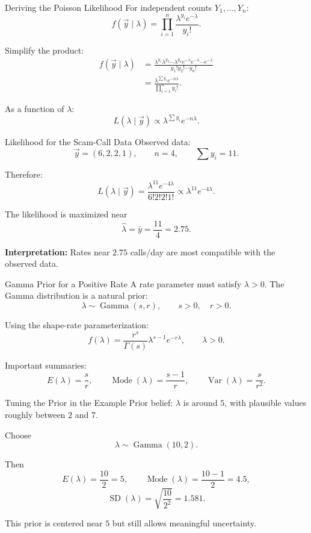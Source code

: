 \documentclass[aspectratio=43,11pt]{beamer}
\newcommand{\GammaDist}{\operatorname{Gamma}}
\begin{document}
\begin{frame}{Deriving the Poisson Likelihood}
For independent counts $Y_1,\ldots,Y_n$:
\[
  f(\vec y\mid \lambda)=\prod_{i=1}^n \frac{\lambda^{y_i}e^{-\lambda}}{y_i!}.
\]

\medskip
Simplify the product:
\[
\begin{aligned}
  f(\vec y\mid \lambda)
  &=\frac{\lambda^{y_1}\lambda^{y_2}\cdots\lambda^{y_n}
      e^{-\lambda}e^{-\lambda}\cdots e^{-\lambda}}
      {y_1!y_2!\cdots y_n!} \\
  &=\frac{\lambda^{\sum y_i}e^{-n\lambda}}{\prod_{i=1}^n y_i!}.
\end{aligned}
\]

As a function of $\lambda$:
\[
  L(\lambda\mid \vec y) \propto \lambda^{\sum y_i}e^{-n\lambda}.
\]
\end{frame}

\begin{frame}{Likelihood for the Scam-Call Data}
Observed data:
\[
  \vec y=(6,2,2,1),\qquad n=4,\qquad \sum y_i=11.
\]

Therefore:
\[
  L(\lambda\mid \vec y)
  =\frac{\lambda^{11}e^{-4\lambda}}{6!2!2!1!}
  \propto \lambda^{11}e^{-4\lambda}.
\]

\medskip
The likelihood is maximized near
\[
  \hat\lambda=\bar y=\frac{11}{4}=2.75.
\]

\medskip
\textbf{Interpretation:} Rates near $2.75$ calls/day are most compatible with the observed data.
\end{frame}

\begin{frame}{Gamma Prior for a Positive Rate}
A rate parameter must satisfy $\lambda>0$.
The Gamma distribution is a natural prior:
\[
  \lambda\sim \GammaDist(s,r), \qquad s>0,\quad r>0.
\]

Using the shape-rate parameterization:
\[
  f(\lambda)=\frac{r^s}{\Gamma(s)}\lambda^{s-1}e^{-r\lambda},\qquad \lambda>0.
\]

\medskip
Important summaries:
\[
  E(\lambda)=\frac{s}{r},\qquad
  \operatorname{Mode}(\lambda)=\frac{s-1}{r},\qquad
  \operatorname{Var}(\lambda)=\frac{s}{r^2}.
\]
\end{frame}

\begin{frame}{Tuning the Prior in the Example}
Prior belief: $\lambda$ is around $5$, with plausible values roughly between $2$ and $7$.

\medskip
Choose
\[
  \lambda\sim\GammaDist(10,2).
\]

Then
\[
  E(\lambda)=\frac{10}{2}=5,
  \qquad
  \operatorname{Mode}(\lambda)=\frac{10-1}{2}=4.5,
\]
\[
  \operatorname{SD}(\lambda)=\sqrt{\frac{10}{2^2}}=1.581.
\]

\medskip
This prior is centered near $5$ but still allows meaningful uncertainty.
\end{frame}
\end{document}
